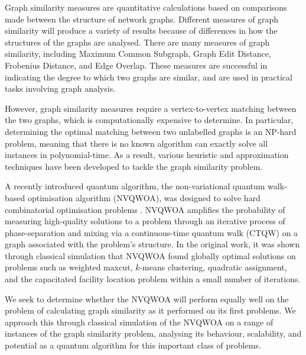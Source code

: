 Graph similarity measures are quantitative calculations based on comparisons made between the structure of network graphs. Different measures of graph similarity will produce a variety of results because of differences in how the structures of the graphs are analysed. There are many measures of graph similarity, including Maximum Common Subgraph, Graph Edit Distance, Frobenius Distance, and Edge Overlap. These measures are successful in indicating the degree to which two graphs are similar, and are used in practical tasks involving graph analysis.

However, graph similarity measures require a vertex-to-vertex matching between the two graphs, which is computationally expensive to determine. In particular, determining the optimal matching between two unlabelled graphs is an NP-hard problem, meaning that there is no known algorithm can exactly solve all instances in polynomial-time. As a result, various heuristic and approximation techniques have been developed to tackle the graph similarity problem.

A recently introduced quantum algorithm, the non-variational quantum walk-based optimisation algorithm (NVQWOA), was designed to solve hard combinatorial optimisation problems \cite{bennett2024nonvariational,bennett2024analysisnonvariationalquantumwalkbased}. NVQWOA amplifies the probability of measuring high-quality solutions to a problem through an iterative process of phase-separation and mixing via a continuous-time quantum walk (CTQW) on a graph associated with the problem's structure. In the original work, it was shown through classical simulation that NVQWOA found globally optimal solutions on problems such as weighted maxcut, $k$-means clustering, quadratic assignment, and the capacitated facility location problem within a small number of iterations.

We seek to determine whether the NVQWOA will perform equally well on the problem of calculating graph similarity as it performed on its first problems. We approach this through classical simulation of the NVQWOA on a range of instances of the graph similarity problem, analysing its behaviour, scalability, and potential as a quantum algorithm for this important class of problems.
